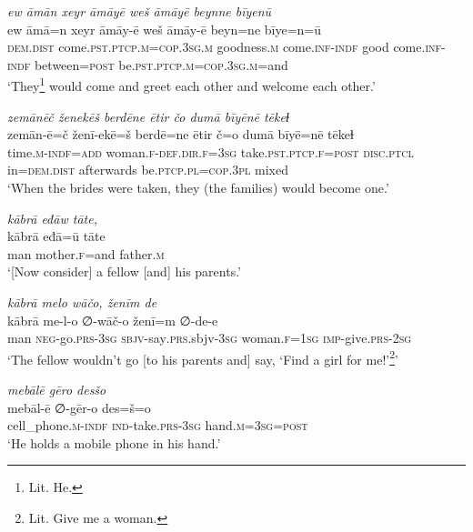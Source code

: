 \ea \label{RE.25}
\textit{ew āmān xeyr āmāyē weš āmāyē beynne bīyenū} \\ 
\gll ew āmā=n xeyr āmāy-ē weš āmāy-ē beyn=ne bīye=n=ū \\ 
 \textsc{dem.dist} come\textsc{.pst}\textsc{.ptcp}\textsc{.m}\textsc{=cop}\textsc{.3sg}\textsc{.m} goodness\textsc{.m} come\textsc{.inf}\textsc{-indf} good come\textsc{.inf}\textsc{-indf} between\textsc{=\textsc{post}} be\textsc{.pst}\textsc{.ptcp}\textsc{.m}\textsc{=cop}\textsc{.3sg}\textsc{.m}=and \\ 
\glt `They\footnote{Lit. He.} would come and greet each other and welcome each other.'
\z 
 
\ea \label{RE.26}
\textit{zemānēč ženekēš berdēne ētir čo dumā bīyēnē tēkeɫ} \\ 
\gll zemān-ē=č ženī-ekē=š berdē=ne ētir č=o dumā bīyē=nē tēkeɫ \\ 
 time\textsc{.m}\textsc{-indf}\textsc{=add} woman\textsc{.f}\textsc{-def}\textsc{.dir}\textsc{.f}\textsc{=3sg} take\textsc{.pst}\textsc{.ptcp}\textsc{.f}\textsc{=\textsc{post}} \textsc{disc.ptcl} in=\textsc{dem.dist} afterwards be\textsc{.ptcp}\textsc{.pl}\textsc{=cop}\textsc{.3pl} mixed \\ 
\glt `When the brides were taken, they (the families) would become one.'
\z 
 
\ea \label{RE.28}
\textit{kābrā eđāw tāte,} \\ 
\gll kābrā eđā=ū tāte \\ 
 man mother\textsc{.f}=and father\textsc{.m} \\ 
\glt `[Now consider] a fellow [and] his parents.'
\z 
 
\ea \label{RE.29}
\textit{kābrā melo wāčo, ženīm de} \\ 
\gll kābrā me-l-o ∅-wāč-o ženī=m ∅-de-e \\ 
 man \textsc{neg-}go\textsc{.prs}\textsc{-3sg} \textsc{sbjv-}say\textsc{.prs}.sbjv\textsc{-3sg} woman\textsc{.f}\textsc{=\textsc{1sg}} \textsc{imp-}give\textsc{.prs}-\textsc{2sg} \\ 
\glt `The fellow wouldn’t go [to his parents and] say, ‘Find a girl for me!’\footnote{Lit. Give me a woman.}'
\z 
 
\ea \label{RE.30}
\textit{mebālē gēro desšo} \\ 
\gll mebāl-ē ∅-gēr-o des=š=o \\ 
 cell\_phone\textsc{.m}\textsc{-indf} \textsc{ind-}take\textsc{.prs}\textsc{-3sg} hand\textsc{.m}\textsc{=3sg}\textsc{=\textsc{post}} \\ 
\glt `He holds a mobile phone in his hand.'
\z 
 
